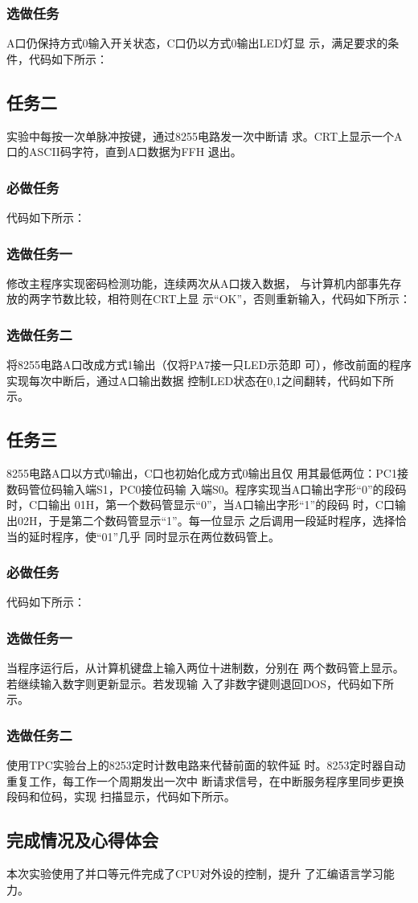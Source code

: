 \documentclass[UTF8,a4paper]{paper}
\begin{document}
\subsubsection{选做任务}
A口仍保持方式0输入开关状态，C口仍以方式0输出LED灯显
示，满足要求的条件，代码如下所示：

\subsection{任务二}
实验中每按一次单脉冲按键，通过8255电路发一次中断请
求。CRT上显示一个A口的ASCII码字符，直到A口数据为FFH
退出。
\subsubsection{必做任务}
代码如下所示：

\subsubsection{选做任务一}
修改主程序实现密码检测功能，连续两次从A口拨入数据，
与计算机内部事先存放的两字节数比较，相符则在CRT上显
示“OK”，否则重新输入，代码如下所示：

\subsubsection{选做任务二}
将8255电路A口改成方式1输出（仅将PA7接一只LED示范即
可），修改前面的程序实现每次中断后，通过A口输出数据
控制LED状态在0,1之间翻转，代码如下所示。

\subsection{任务三}
8255电路A口以方式0输出，C口也初始化成方式0输出且仅
用其最低两位：PC1接数码管位码输入端S1，PC0接位码输
入端S0。程序实现当A口输出字形“0”的段码时，C口输出
01H，第一个数码管显示“0”，当A口输出字形“1”的段码
时，C口输出02H，于是第二个数码管显示“1”。每一位显示
之后调用一段延时程序，选择恰当的延时程序，使“01”几乎
同时显示在两位数码管上。
\subsubsection{必做任务}
代码如下所示：

\subsubsection{选做任务一}
当程序运行后，从计算机键盘上输入两位十进制数，分别在
两个数码管上显示。若继续输入数字则更新显示。若发现输
入了非数字键则退回DOS，代码如下所示。

\subsubsection{选做任务二}
使用TPC实验台上的8253定时计数电路来代替前面的软件延
时。8253定时器自动重复工作，每工作一个周期发出一次中
断请求信号，在中断服务程序里同步更换段码和位码，实现
扫描显示，代码如下所示。

\subsection{完成情况及心得体会}
本次实验使用了并口等元件完成了CPU对外设的控制，提升
了汇编语言学习能力。
\end{document}
